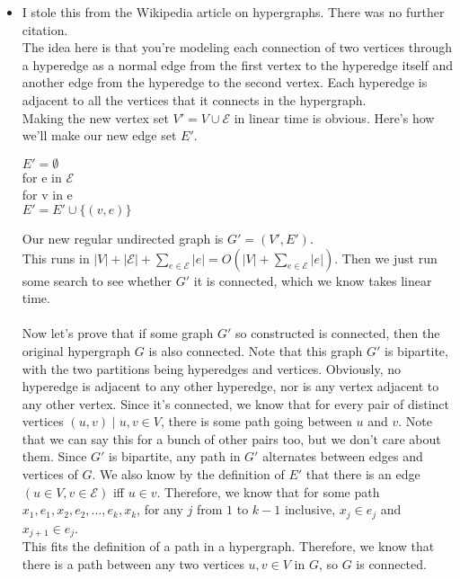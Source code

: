 \documentclass[11pt]{article}
\begin{document}
\begin{solution}
    \begin{itemize}
        \item I stole this from the Wikipedia article on hypergraphs. There was no further citation. 
            \\ The idea here is that you're modeling each connection of two vertices through a hyperedge as a normal edge from the first vertex to the hyperedge itself and another edge from the hyperedge to the second vertex. Each hyperedge is adjacent to all the vertices that it connects in the hypergraph.
            \\ Making the new vertex set $V' = V \cup \mathcal{E}$ in linear time is obvious. Here's how we'll make our new edge set $E'$.
            \begin{algo}
                $E' = \emptyset$
                \\ for e in $\mathcal{E}$ \+
                \\ for v in e \+
                \\ $E' = E' \cup \{(v, e)\}$ 
            \end{algo}
            Our new regular undirected graph is $G' = (V', E')$.
            \\ This runs in $|V| + |\mathcal{E}| + \sum_{e \in \mathcal{E}} |e| = O(|V| +\sum_{e \in \mathcal{E}}|e|)$. Then we just run some search to see whether $G'$ it is connected, which we know takes linear time.
            \\ \\ Now let's prove that if some graph $G'$ so constructed is connected, then the original hypergraph $G$ is also connected. Note that this graph $G'$ is bipartite, with the two partitions being hyperedges and vertices. Obviously, no hyperedge is adjacent to any other hyperedge, nor is any vertex adjacent to any other vertex. Since it's connected, we know that for every pair of distinct vertices $(u, v) \mid u, v \in V$, there is some path going between $u$ and $v$. Note that we can say this for a bunch of other pairs too, but we don't care about them. Since $G'$ is bipartite, any path in $G'$ alternates between edges and vertices of $G$. We also know by the definition of $E'$ that there is an edge $(u \in V, v \in \mathcal{E})$ iff $u \in v$. Therefore, we know that for some path $x_1, e_1, x_2, e_2,\ldots, e_k, x_k$, for any $j$ from $1$ to $k - 1$ inclusive, $x_j \in e_j$ and $x_{j+1} \in e_j$.
            \\ This fits the definition of a path in a hypergraph. Therefore, we know that there is a path between any two vertices $u, v \in V$ in $G$, so $G$ is connected.

\end{itemize}
\end{solution}
\end{document}
